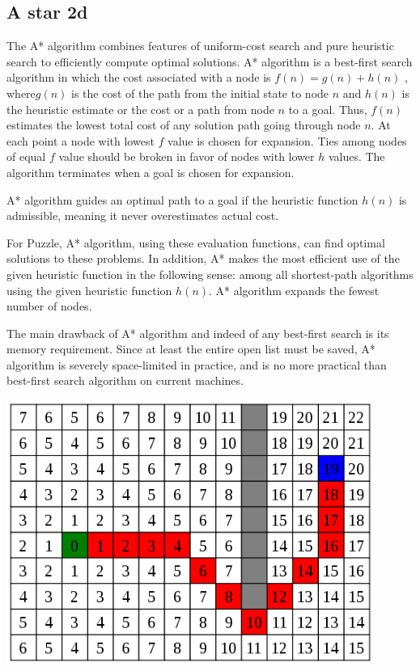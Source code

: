 \documentclass[article]{report}         %
\begin{document}
        \subsection{A star 2d}
          The A* algorithm combines features of uniform-cost search and pure heuristic search to efficiently compute optimal solutions. A* algorithm is a best-first search algorithm in which the cost associated with a node is $ f (n) = g(n) + h(n) $ , where$  g(n) $  is the cost of the path from the initial state to node $ n $ and $ h(n) $ is the heuristic estimate or the cost or a path from node $ n $ to a goal. Thus, $ f(n) $ estimates the lowest total cost of any solution path going through node $ n $. At each point a node with lowest $ f $ value is chosen for expansion. Ties among nodes of equal $ f $ value should be broken in favor of nodes with lower $ h $ values. The algorithm terminates when a goal is chosen for expansion.

          A* algorithm guides an optimal path to a goal if the heuristic function $ h(n) $ is admissible, meaning it never overestimates actual cost.

          For Puzzle, A* algorithm, using these evaluation functions, can find optimal solutions to these problems. In addition, A* makes the most efficient use of the given heuristic function in the following sense: among all shortest-path algorithms using the given heuristic function $ h(n) $. A* algorithm expands the fewest number of nodes.

          The main drawback of A* algorithm and indeed of any best-first search is its memory requirement. Since at least the entire open list must be saved, A* algorithm is severely space-limited in practice, and is no more practical than best-first search algorithm on current machines. \\

\begin{center}
 \includegraphics[width=12cm]{images/AStar_2.png}
\end{center}
\end{document}
